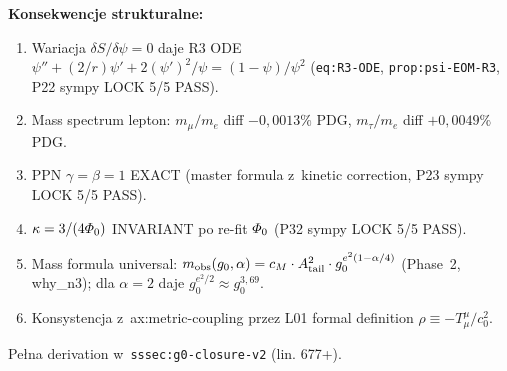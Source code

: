 \begin{remark}
\textbf{Konsekwencje strukturalne:}
\begin{enumerate}[nosep]
  \item Wariacja $\delta S/\delta\psi=0$ daje R3 ODE
    $\psi'' + (2/r)\psi' + 2(\psi')^2/\psi = (1-\psi)/\psi^2$
    (\texttt{eq:R3-ODE}, \texttt{prop:psi-EOM-R3}, P22 sympy LOCK 5/5 PASS).
  \item Mass spectrum lepton: $m_\mu/m_e$ diff $-0{,}0013\%$ PDG,
    $m_\tau/m_e$ diff $+0{,}0049\%$ PDG.
  \item PPN $\gamma=\beta=1$ EXACT (master formula z~kinetic correction,
    P23 sympy LOCK 5/5 PASS).
  \item $\kappa = 3/(4\varPhi_0)$ INVARIANT po re-fit $\varPhi_0$
    (P32 sympy LOCK 5/5 PASS).
  \item Mass formula universal:
    $m_{\rm obs}(g_0,\alpha) = c_M \cdot A_{\rm tail}^2 \cdot g_0^{e^2(1-\alpha/4)}$
    (Phase~2, why\_n3); dla $\alpha=2$ daje $g_0^{e^2/2} \approx g_0^{3{,}69}$.
  \item Konsystencja z~ax:metric-coupling przez L01 formal definition
    $\rho \equiv -T^\mu_\mu/c_0^2$.
\end{enumerate}

Pe\l{}na derivation w~\texttt{sssec:g0-closure-v2} (lin. 677+).
\end{remark}

